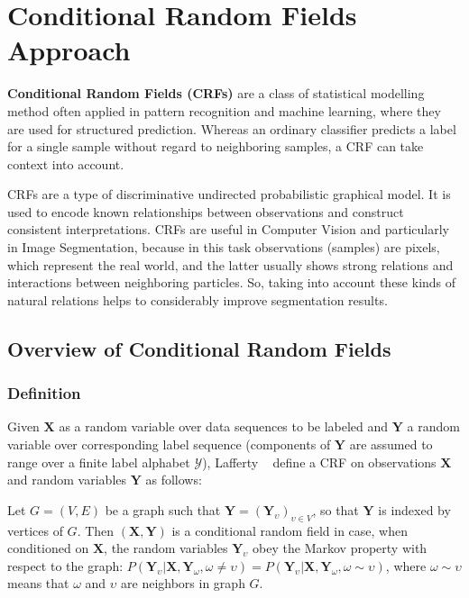 \chapter{Conditional Random Fields Approach}
\label{Chapter3}

{\bf Conditional Random Fields (CRFs)} are a class of statistical modelling method
often applied in pattern recognition and machine learning, where they are used
for structured prediction. Whereas an ordinary classifier predicts a label for a
single sample without regard to neighboring samples, a CRF can take context
into account.

CRFs are a type of discriminative undirected probabilistic graphical model. It
is used to encode known relationships between observations and construct
consistent interpretations. CRFs are useful in Computer Vision and particularly in Image Segmentation,
because in this task observations (samples) are pixels, which represent the real world, and
the latter usually shows strong relations and interactions between neighboring particles. So, taking into
account these kinds of natural relations helps to considerably improve segmentation results.

\section{Overview of Conditional Random Fields}
\label{sec:crf_definition}
\subsection{Definition}
Given $ \mathbf{X} $ as a random variable over data sequences to be labeled and $ \mathbf{Y} $ a random variable over corresponding label sequence
(components of $ \mathbf{Y} $ are assumed to range over a finite label alphabet $ \mathcal{Y} $), Lafferty \etal~\cite{Lafferty2001} 
define a CRF on observations $ \mathbf{X} $ and random variables $ \mathbf{Y} $ as follows:

\begin{definition}
Let $ G = (V, E) $ be a graph such that $ \mathbf{Y} = (\mathbf{Y}_\upsilon)_{\upsilon \in V}$, so that $ \mathbf{Y} $ is indexed by vertices of $ G $. 
Then $ (\mathbf{X}, \mathbf{Y}) $ is a conditional random field in case, when conditioned on $ \mathbf{X} $, 
the random variables $ \mathbf{Y}_\upsilon $ obey the Markov property with respect to the graph: 
$ P(\mathbf{Y}_\upsilon | \mathbf{X}, \mathbf{Y}_{\omega}, \omega \neq \upsilon) = P(\mathbf{Y}_\upsilon | \mathbf{X}, \mathbf{Y}_{\omega}, \omega \sim \upsilon) $,
where $ \omega \sim \upsilon $ means that $ \omega $ and $ \upsilon $ are neighbors in graph $ G $.
\end{definition}

